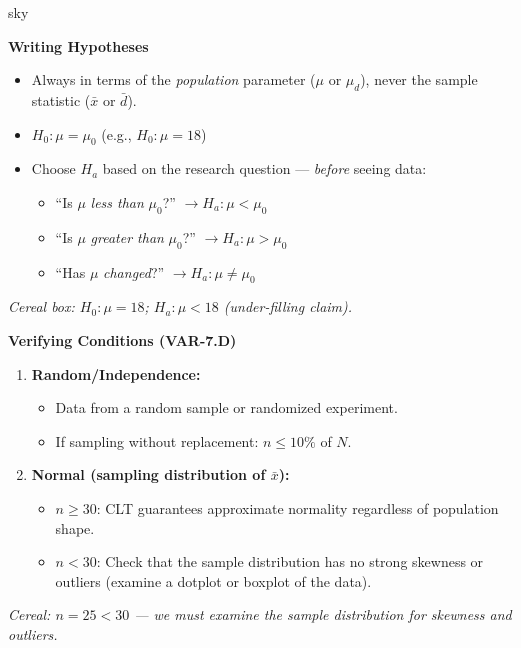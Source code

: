 \documentclass[10pt]{article}
\begin{document}
\begin{skillbox}{sky}
\begin{minipage}[t]{0.48\linewidth}
    \textbf{Writing Hypotheses}
    \begin{itemize}
        \item Always in terms of the \emph{population} parameter ($\mu$ or $\mu_d$),
              never the sample statistic ($\bar x$ or $\bar d$).
        \item $H_0: \mu = \mu_0$ (e.g., $H_0: \mu = 18$)
        \item Choose $H_a$ based on the research question --- \emph{before} seeing data:
              \begin{itemize}
                  \item ``Is $\mu$ \emph{less than} $\mu_0$?'' $\to H_a: \mu < \mu_0$
                  \item ``Is $\mu$ \emph{greater than} $\mu_0$?'' $\to H_a: \mu > \mu_0$
                  \item ``Has $\mu$ \emph{changed}?'' $\to H_a: \mu \ne \mu_0$
              \end{itemize}
    \end{itemize}
    \textit{Cereal box: $H_0: \mu = 18$; $H_a: \mu < 18$ (under-filling claim).}
\end{minipage}
\hfill
\begin{minipage}[t]{0.48\linewidth}
    \textbf{Verifying Conditions (VAR-7.D)}
    \begin{enumerate}
        \item \textbf{Random/Independence:}
              \begin{itemize}
                  \item Data from a random sample or randomized experiment.
                  \item If sampling without replacement: $n \le 10\%$ of $N$.
              \end{itemize}
        \item \textbf{Normal (sampling distribution of $\bar x$):}
              \begin{itemize}
                  \item $n \ge 30$: CLT guarantees approximate normality regardless of
                        population shape.
                  \item $n < 30$: Check that the sample distribution has no strong
                        skewness or outliers (examine a dotplot or boxplot of the data).
              \end{itemize}
    \end{enumerate}
    \textit{Cereal: $n = 25 < 30$ --- we must examine the sample distribution for
    skewness and outliers.}
\end{minipage}
\end{skillbox}
\end{document}
